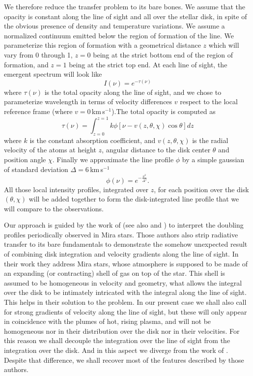 \documentclass{/Users/art2/TeX/aanda/aa}
\def\kms {km\,s$^{-1}$}
\begin{document}
We therefore reduce the transfer problem to its bare bones. We assume that the opacity is constant along the line of sight and all over the stellar 
disk, in spite of the obvious presence of density and temperature variations. We assume a normalized continuum emitted below the region of 
formation of the line. We parameterize this region of formation with a geometrical distance $z$ which will vary from 0 through 1, $z=0$ being at 
the strict bottom end of the region of formation, and $z=1$ being at the strict top end. At each line of sight, the emergent spectrum will look like
\begin{equation}
   I(\nu)=e^{-\tau(\nu)}  %
\end{equation}
where $\tau(\nu)$ is the total opacity along the line of sight, and we chose to parameterize wavelength in terms of velocity differences $v$ respect 
to the local reference frame (where $v=0$\,\kms).The total opacity is computed as 
\begin{equation}
   \tau(\nu)=\int_{z=0}^{z=1} k \phi[\nu-v(z,\theta,\chi )\cos \theta]dz
   \label{opacityintegral}
\end{equation}
where $k$ is the constant absorption coefficient, and $v(z,\theta,\chi)$ is the radial velocity of the atoms at height $z$, angular distance to the
disk center  $\theta$ and position angle $\chi$. Finally we approximate the line profile $\phi$ by a simple gaussian of standard deviation $\Delta=6$\,\kms \citep{lopez_ariste_convective_2018}
\begin{equation}
   \phi(\nu)= e^{-\frac{\nu^2}{\Delta^2}}.
\end{equation}
All those local intensity profiles, integrated over $z$, for each position over the disk $(\theta,\chi)$ will be added together to form the 
disk-integrated line profile that we will compare to the observations.

Our approach is guided by the work of \cite{bertout_line_1987} (see also \cite{wagenblast_spectral_1983} and \cite{chandrasekhar_formation_1945}) to interpret the doubling profiles periodically observed in Mira 
stars. Those authors also strip radiative transfer to its bare fundamentals to demonstrate the somehow unexpected result of combining disk integration 
and velocity gradients along the line of sight. In their work they address Mira stars, whose atmosphere is supposed to be made of an expanding (or contracting)
shell of gas on top of the star. This shell is assumed to be homogeneous in velocity and geometry, what allows the integral over the disk to be 
intimately intricated with the integral along the line of sight. This helps in their solution to the problem. In our present case we shall also call 
for strong gradients of velocity along the line of sight, but these will only appear in coincidence with the plumes of hot, rising plasma, and will not be 
homogeneous nor in their distribution over the disk nor in their velocities. For this reason we shall decouple the integration over the line 
of sight from the integration over the disk. And in this aspect we diverge from the work of \cite{bertout_line_1987}. Despite that difference, we shall recover most 
of the features described by those authors.
\end{document}

